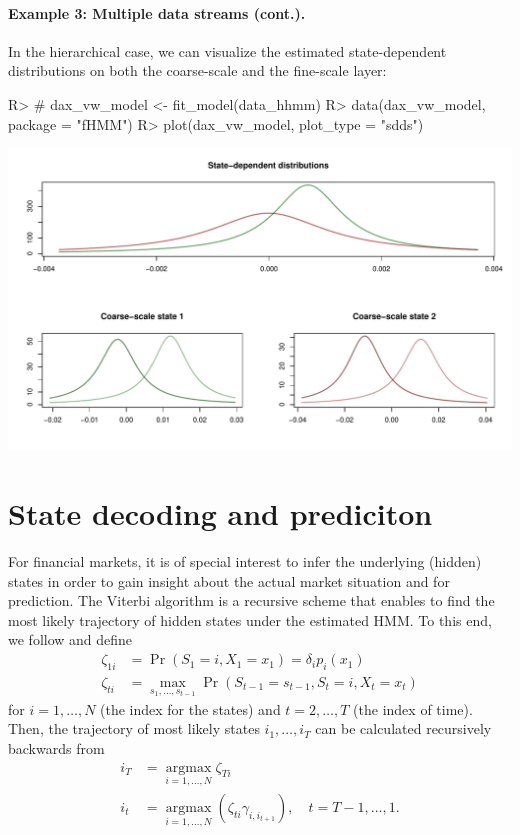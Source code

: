 \documentclass[article]{jss}
\begin{document}
\paragraph{Example 3: Multiple data streams (cont.).}

In the hierarchical case, we can visualize the estimated state-dependent distributions on both the coarse-scale and the fine-scale layer:

%
\begin{Schunk}
\begin{Sinput}
R> # dax_vw_model <- fit_model(data_hhmm)
R> data(dax_vw_model, package = "fHMM")
R> plot(dax_vw_model, plot_type = "sdds")
\end{Sinput}
\end{Schunk}
\includegraphics{fhmm_oelschlaeger_adam_michels-hhmm-sdds}
%

\section{State decoding and prediciton} \label{sec:state_decoding_and_prediction} %

For financial markets, it is of special interest to infer the underlying (hidden) states in order to gain insight about the actual market situation and for prediction. The Viterbi algorithm \citep{for73} is a recursive scheme that enables to find the most likely trajectory of hidden states under the estimated HMM. To this end, we follow \cite{zuc16} and define
\begin{align*}
  \zeta_{1i} &= \Pr(S_1 = i, X_1 = x_1) = \delta_i p_i(x_1) \\
  \zeta_{ti} &= \operatorname*{max}_{s_1, \ldots, s_{t-1}} \Pr(S_{t-1} = s_{t-1}, S_t = i, X_t = x_t)
\end{align*}
for $i = 1, \ldots, N$ (the index for the states) and $t = 2, \ldots, T$ (the index of time). Then, the trajectory of most likely states $i_1, \ldots, i_T$ can be calculated recursively backwards from
\begin{align*}
  i_T &= \operatorname*{argmax}_{i = 1, \ldots, N} \zeta_{Ti} \\
  i_t &= \operatorname*{argmax}_{i = 1, \ldots, N} (\zeta_{ti} \gamma_{i, i_{t+1}}), \quad t = T-1, \ldots, 1.
\end{align*}
\end{document}
